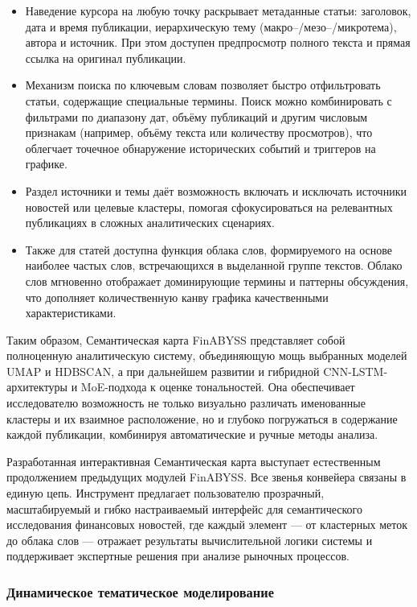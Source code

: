 \begin{itemize}
    \item Наведение курсора на любую точку раскрывает метаданные статьи: заголовок, дата и время публикации,
    иерархическую тему (макро–/мезо–/микротема), автора и источник. При этом доступен предпросмотр полного
    текста и прямая ссылка на оригинал публикации.
    \item Механизм поиска по ключевым словам позволяет быстро отфильтровать статьи, содержащие специальные термины.
    Поиск можно комбинировать с фильтрами по диапазону дат, объёму публикаций и другим числовым признакам (например,
    объёму текста или количеству просмотров), что облегчает точечное обнаружение исторических событий и триггеров
    на графике.
    \item Раздел источники и темы даёт возможность включать и исключать источники новостей или целевые кластеры,
    помогая сфокусироваться на релевантных публикациях в сложных аналитических сценариях.
    \item Также для статей доступна функция облака слов, формируемого на основе наиболее частых слов, встречающихся
    в выделанной группе текстов. Облако слов мгновенно отображает доминирующие термины и паттерны обсуждения,
    что дополняет количественную канву графика качественными характеристиками.
\end{itemize}

Таким образом, Семантическая карта FinABYSS представляет собой полноценную аналитическую систему,
объединяющую мощь выбранных моделей UMAP и HDBSCAN, а при дальнейшем развитии и гибридной CNN-LSTM-архитектуры
и MoE-подхода к оценке тональностей. Она обеспечивает исследователю возможность не только визуально различать
именованные кластеры и их взаимное расположение, но и глубоко погружаться в содержание каждой публикации,
комбинируя автоматические и ручные методы анализа.

Разработанная интерактивная Семантическая карта выступает естественным продолжением предыдущих модулей FinABYSS.
Все звенья конвейера связаны в единую цепь. Инструмент предлагает пользователю прозрачный, масштабируемый
и гибко настраиваемый интерфейс для семантического исследования финансовых новостей, где каждый элемент ---
от кластерных меток до облака слов — отражает результаты вычислительной логики системы и поддерживает экспертные
решения при анализе рыночных процессов.

\subsubsection{Динамическое тематическое моделирование}

